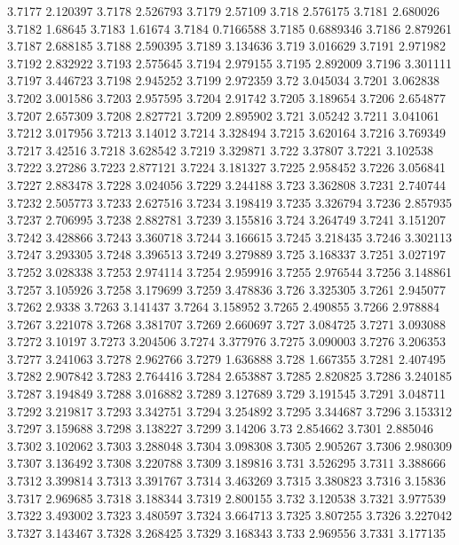 3.7177  2.120397
3.7178  2.526793
3.7179  2.57109
3.718  2.576175
3.7181  2.680026
3.7182  1.68645
3.7183  1.61674
3.7184  0.7166588
3.7185  0.6889346
3.7186  2.879261
3.7187  2.688185
3.7188  2.590395
3.7189  3.134636
3.719  3.016629
3.7191  2.971982
3.7192  2.832922
3.7193  2.575645
3.7194  2.979155
3.7195  2.892009
3.7196  3.301111
3.7197  3.446723
3.7198  2.945252
3.7199  2.972359
3.72  3.045034
3.7201  3.062838
3.7202  3.001586
3.7203  2.957595
3.7204  2.91742
3.7205  3.189654
3.7206  2.654877
3.7207  2.657309
3.7208  2.827721
3.7209  2.895902
3.721  3.05242
3.7211  3.041061
3.7212  3.017956
3.7213  3.14012
3.7214  3.328494
3.7215  3.620164
3.7216  3.769349
3.7217  3.42516
3.7218  3.628542
3.7219  3.329871
3.722  3.37807
3.7221  3.102538
3.7222  3.27286
3.7223  2.877121
3.7224  3.181327
3.7225  2.958452
3.7226  3.056841
3.7227  2.883478
3.7228  3.024056
3.7229  3.244188
3.723  3.362808
3.7231  2.740744
3.7232  2.505773
3.7233  2.627516
3.7234  3.198419
3.7235  3.326794
3.7236  2.857935
3.7237  2.706995
3.7238  2.882781
3.7239  3.155816
3.724  3.264749
3.7241  3.151207
3.7242  3.428866
3.7243  3.360718
3.7244  3.166615
3.7245  3.218435
3.7246  3.302113
3.7247  3.293305
3.7248  3.396513
3.7249  3.279889
3.725  3.168337
3.7251  3.027197
3.7252  3.028338
3.7253  2.974114
3.7254  2.959916
3.7255  2.976544
3.7256  3.148861
3.7257  3.105926
3.7258  3.179699
3.7259  3.478836
3.726  3.325305
3.7261  2.945077
3.7262  2.9338
3.7263  3.141437
3.7264  3.158952
3.7265  2.490855
3.7266  2.978884
3.7267  3.221078
3.7268  3.381707
3.7269  2.660697
3.727  3.084725
3.7271  3.093088
3.7272  3.10197
3.7273  3.204506
3.7274  3.377976
3.7275  3.090003
3.7276  3.206353
3.7277  3.241063
3.7278  2.962766
3.7279  1.636888
3.728  1.667355
3.7281  2.407495
3.7282  2.907842
3.7283  2.764416
3.7284  2.653887
3.7285  2.820825
3.7286  3.240185
3.7287  3.194849
3.7288  3.016882
3.7289  3.127689
3.729  3.191545
3.7291  3.048711
3.7292  3.219817
3.7293  3.342751
3.7294  3.254892
3.7295  3.344687
3.7296  3.153312
3.7297  3.159688
3.7298  3.138227
3.7299  3.14206
3.73  2.854662
3.7301  2.885046
3.7302  3.102062
3.7303  3.288048
3.7304  3.098308
3.7305  2.905267
3.7306  2.980309
3.7307  3.136492
3.7308  3.220788
3.7309  3.189816
3.731  3.526295
3.7311  3.388666
3.7312  3.399814
3.7313  3.391767
3.7314  3.463269
3.7315  3.380823
3.7316  3.15836
3.7317  2.969685
3.7318  3.188344
3.7319  2.800155
3.732  3.120538
3.7321  3.977539
3.7322  3.493002
3.7323  3.480597
3.7324  3.664713
3.7325  3.807255
3.7326  3.227042
3.7327  3.143467
3.7328  3.268425
3.7329  3.168343
3.733  2.969556
3.7331  3.177135
